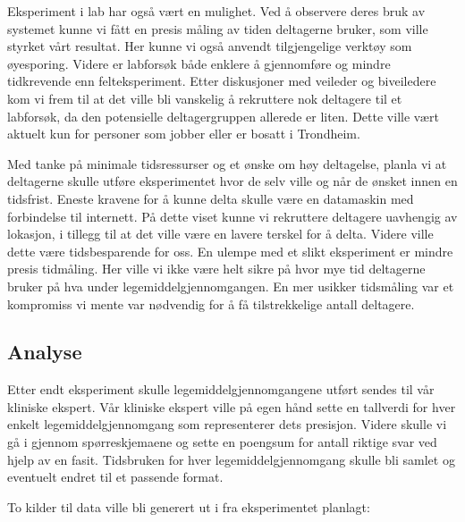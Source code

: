 Eksperiment i lab har også vært en mulighet. Ved å observere deres bruk av systemet kunne vi fått en presis måling av tiden deltagerne bruker, som ville styrket vårt resultat. Her kunne vi også anvendt tilgjengelige verktøy som øyesporing. Videre er labforsøk både enklere å gjennomføre og mindre tidkrevende enn felteksperiment. Etter diskusjoner med veileder og biveiledere kom vi frem til at det ville bli vanskelig å rekruttere nok deltagere til et labforsøk, da den potensielle deltagergruppen allerede er liten. Dette ville vært aktuelt kun for personer som jobber eller er bosatt i Trondheim. 

Med tanke på minimale tidsressurser og et ønske om høy deltagelse, planla vi at deltagerne skulle utføre eksperimentet hvor de selv ville og når de ønsket innen en tidsfrist. Eneste kravene for å kunne delta skulle være en datamaskin med forbindelse til internett. På dette viset kunne vi rekruttere deltagere uavhengig av lokasjon, i tillegg til at det ville være en lavere terskel for å delta. Videre ville dette være tidsbesparende for oss. En ulempe med et slikt eksperiment er mindre presis tidmåling. Her ville vi ikke være helt sikre på hvor mye tid deltagerne bruker på hva under legemiddelgjennomgangen. En mer usikker tidsmåling var et kompromiss vi mente var nødvendig for å få tilstrekkelige antall deltagere.

\subsection{Analyse}
Etter endt eksperiment skulle legemiddelgjennomgangene utført sendes til vår kliniske ekspert. Vår kliniske ekspert ville på egen hånd sette en tallverdi for hver enkelt legemiddelgjennomgang som representerer dets presisjon. Videre skulle vi gå i gjennom spørreskjemaene og sette en poengsum for antall riktige svar ved hjelp av en fasit. Tidsbruken for hver legemiddelgjennomgang skulle bli samlet og eventuelt endret til et passende format. 

To kilder til data ville bli generert ut i fra eksperimentet planlagt: 

